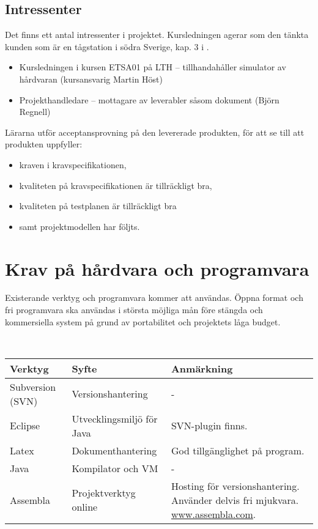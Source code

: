 \documentclass[a4paper]{article}
\begin{document}
\subsection{Intressenter} %
Det finns ett antal intressenter i projektet. Kursledningen agerar som den tänkta kunden som är en tågstation i södra Sverige, kap. 3 i \cite{engproc}.

\begin{itemize}
\item Kursledningen i kursen ETSA01 på LTH -- tillhandahåller simulator av hårdvaran (kursansvarig Martin Höst)
\item Projekthandledare -- mottagare av leverabler såsom dokument (Björn Regnell)
\end{itemize}

Lärarna utför acceptansprovning på den levererade produkten, för att se till att produkten uppfyller:

\begin{itemize}
\item kraven i kravspecifikationen,
\item kvaliteten på kravspecifikationen är tillräckligt bra,
\item kvaliteten på testplanen är tillräckligt bra
\item samt projektmodellen har följts.
\end{itemize}

\section{Krav på hårdvara och programvara} %
Existerande verktyg och programvara kommer att användas. Öppna format och fri programvara ska användas i största möjliga mån före stängda och kommersiella system på grund av portabilitet och projektets låga budget.

\ \\

\begin{tabular}{l|l|p{3.5cm}}
\textbf{Verktyg}		&	\textbf{Syfte}	&	\textbf{Anmärkning} \\
\hline
Subversion (SVN)		 &	 Versionshantering 	&	 - \\
Eclipse		 &	 Utvecklingsmiljö för Java	 &	 SVN-plugin finns. \\
Latex 	&	 Dokumenthantering	 &	 God tillgänglighet på program. \\
Java		 &	 Kompilator och VM 	&	 - \\
Assembla		 &	 Projektverktyg online	 & 		Hosting för versionshantering. Använder delvis fri mjukvara. \url{www.assembla.com}. \\
\end{tabular}
\end{document}
